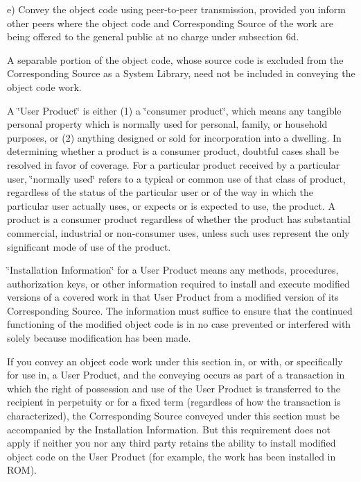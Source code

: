 e) Convey the object code using peer-\/to-\/peer transmission, provided you inform other peers where the object code and Corresponding Source of the work are being offered to the general public at no charge under subsection 6d.

A separable portion of the object code, whose source code is excluded from the Corresponding Source as a System Library, need not be included in conveying the object code work.

A \char`\"{}\-User Product\char`\"{} is either (1) a \char`\"{}consumer product\char`\"{}, which means any tangible personal property which is normally used for personal, family, or household purposes, or (2) anything designed or sold for incorporation into a dwelling. In determining whether a product is a consumer product, doubtful cases shall be resolved in favor of coverage. For a particular product received by a particular user, \char`\"{}normally used\char`\"{} refers to a typical or common use of that class of product, regardless of the status of the particular user or of the way in which the particular user actually uses, or expects or is expected to use, the product. A product is a consumer product regardless of whether the product has substantial commercial, industrial or non-\/consumer uses, unless such uses represent the only significant mode of use of the product.

\char`\"{}\-Installation Information\char`\"{} for a User Product means any methods, procedures, authorization keys, or other information required to install and execute modified versions of a covered work in that User Product from a modified version of its Corresponding Source. The information must suffice to ensure that the continued functioning of the modified object code is in no case prevented or interfered with solely because modification has been made.

If you convey an object code work under this section in, or with, or specifically for use in, a User Product, and the conveying occurs as part of a transaction in which the right of possession and use of the User Product is transferred to the recipient in perpetuity or for a fixed term (regardless of how the transaction is characterized), the Corresponding Source conveyed under this section must be accompanied by the Installation Information. But this requirement does not apply if neither you nor any third party retains the ability to install modified object code on the User Product (for example, the work has been installed in R\-O\-M).


